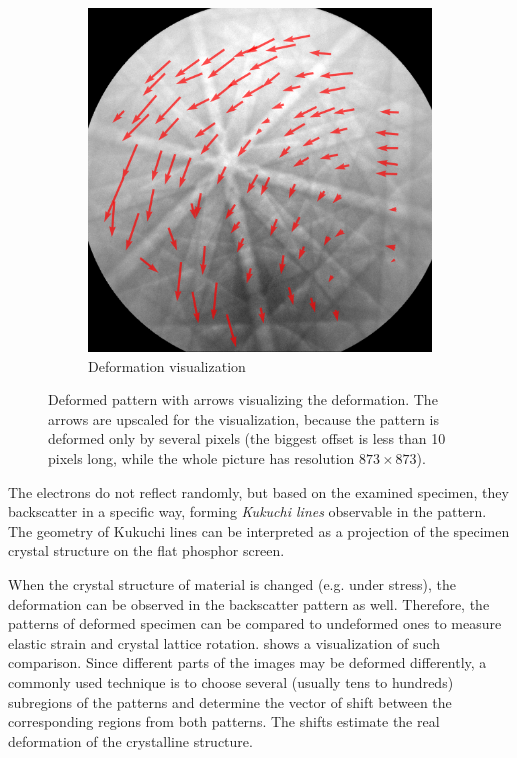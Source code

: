 \begin{figure}
\begin{subfigure}{.4\textwidth}
	\end{subfigure}
	\centering
	\begin{subfigure}{.4\textwidth}
		\centering
		\includegraphics[width=.9\linewidth]{img/roi_shifts}
		\caption{Deformation visualization}
		\label{roi-shifts:result}
	\end{subfigure}
	
	\caption{Deformed pattern with arrows visualizing the deformation. The arrows are upscaled for the visualization, because the pattern is deformed only by several pixels (the biggest offset is less than 10 pixels long, while the whole picture has resolution $873 \times 873$).}
	\label{roi-shifts}
\end{figure}

The electrons do not reflect randomly, but based on the examined specimen, they backscatter in a specific way, forming \emph{Kukuchi lines} observable in the pattern. The geometry of Kukuchi lines can be interpreted as a projection of the specimen crystal structure on the flat phosphor screen.

When the crystal structure of material is changed (e.g. under stress), the deformation can be observed in the backscatter pattern as well. Therefore, the patterns of deformed specimen can be compared to undeformed ones to measure elastic strain and crystal lattice rotation.   shows a visualization of such comparison. Since different parts of the images may be deformed differently, a commonly used technique \cite{wilkinson2006high,wilkinson2010high,britton2012high} is to choose several (usually tens to hundreds) subregions of the patterns and determine the vector of shift between the corresponding regions from both patterns. The shifts estimate the real deformation of the crystalline structure.

